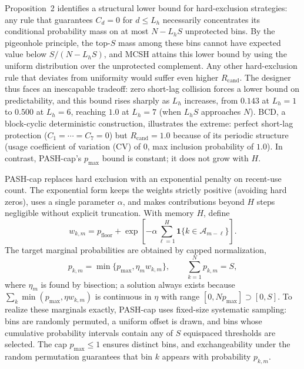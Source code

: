 \documentclass[letterpaper,journal,10pt]{IEEEtran}
\begin{document}
Proposition~2 identifies a structural lower bound for hard-exclusion
strategies: any rule that guarantees $C_d=0$ for $d\leq L_h$ necessarily
concentrates its conditional probability mass on at most $N-L_hS$
unprotected bins. By the pigeonhole principle, the top-$S$ mass among these
bins cannot have expected value below $S/(N-L_hS)$, and MCSH attains this
lower bound by using the uniform distribution over the unprotected
complement. Any other hard-exclusion rule that deviates from uniformity
would suffer even higher $R_{\mathrm{cand}}$. The designer thus faces an
inescapable tradeoff: zero short-lag collision forces a lower bound on
predictability, and this bound rises sharply as $L_h$ increases, from
$0.143$ at $L_h{=}1$ to $0.500$ at $L_h{=}6$, reaching $1.0$ at $L_h{=}7$ (when $L_hS$ approaches $N$). BCD, a block-cyclic deterministic
construction, illustrates the extreme: perfect short-lag protection
($C_1{=}\cdots{=}C_7{=}0$) but $R_{\mathrm{cand}}{=}1.0$ because of its
periodic structure (usage coefficient of variation (CV) of $0$, max inclusion
probability of $1.0$). In contrast, PASH-cap's $p_{\max}$ bound is
constant; it does not grow with $H$.

PASH-cap replaces hard exclusion with an exponential penalty on recent-use
count. The exponential form keeps the weights strictly positive (avoiding hard
zeros), uses a single parameter $\alpha$, and makes contributions beyond
$H$ steps negligible without explicit truncation. With memory $H$, define
\begin{equation}
w_{k,m}=p_{\mathrm{floor}}+
\exp\!\left[-\alpha\sum_{\ell=1}^{H}\mathbf 1\{k\in\mathcal A_{m-\ell}\}\right].
\end{equation}
The target marginal probabilities are obtained by capped normalization,
\begin{equation}
p_{k,m}=\min\{p_{\max},\eta_m w_{k,m}\},\qquad \sum_{k=1}^{N}p_{k,m}=S,
\label{eq:cap}
\end{equation}
where $\eta_m$ is found by bisection; a solution always exists because
$\sum_k\min(p_{\max},\eta w_{k,m})$ is continuous in $\eta$ with range
$[0,N p_{\max}]\supset[0,S]$.
To realize these marginals exactly, PASH-cap uses fixed-size systematic
sampling: bins are randomly permuted, a uniform offset is drawn, and
bins whose cumulative probability intervals contain any of $S$ equispaced
thresholds are selected. The cap $p_{\max}\leq1$ ensures distinct bins,
and exchangeability under the random permutation guarantees that bin $k$
appears with probability $p_{k,m}$.
\end{document}
